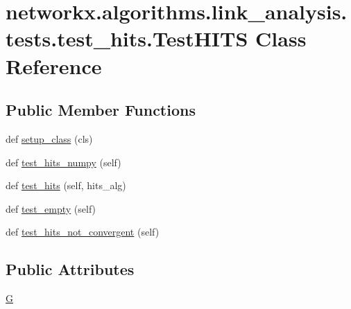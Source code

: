 \hypertarget{classnetworkx_1_1algorithms_1_1link__analysis_1_1tests_1_1test__hits_1_1TestHITS}{}\section{networkx.\+algorithms.\+link\+\_\+analysis.\+tests.\+test\+\_\+hits.\+Test\+H\+I\+TS Class Reference}
\label{classnetworkx_1_1algorithms_1_1link__analysis_1_1tests_1_1test__hits_1_1TestHITS}
\subsection*{Public Member Functions}
\begin{DoxyCompactItemize}
\item 
def \hyperlink{classnetworkx_1_1algorithms_1_1link__analysis_1_1tests_1_1test__hits_1_1TestHITS_aa192524bc4337dfa29bc9e1e7dc4617a}{setup\+\_\+class} (cls)
\item 
def \hyperlink{classnetworkx_1_1algorithms_1_1link__analysis_1_1tests_1_1test__hits_1_1TestHITS_a2e1c031b8b73f052ba9aa793a6d6bcd7}{test\+\_\+hits\+\_\+numpy} (self)
\item 
def \hyperlink{classnetworkx_1_1algorithms_1_1link__analysis_1_1tests_1_1test__hits_1_1TestHITS_a9cfc2a11ee9527ca9b9bcc00ea648fef}{test\+\_\+hits} (self, hits\+\_\+alg)
\item 
def \hyperlink{classnetworkx_1_1algorithms_1_1link__analysis_1_1tests_1_1test__hits_1_1TestHITS_a79b62ce45de5cbd11cfafc7f1e254ce6}{test\+\_\+empty} (self)
\item 
def \hyperlink{classnetworkx_1_1algorithms_1_1link__analysis_1_1tests_1_1test__hits_1_1TestHITS_ab317875960f591d2ea9848a69cd1c741}{test\+\_\+hits\+\_\+not\+\_\+convergent} (self)
\end{DoxyCompactItemize}
\subsection*{Public Attributes}
\begin{DoxyCompactItemize}
\item 
\hyperlink{classnetworkx_1_1algorithms_1_1link__analysis_1_1tests_1_1test__hits_1_1TestHITS_aee2c6f29375251dabb775b82df37cdbb}{G}
\end{DoxyCompactItemize}


